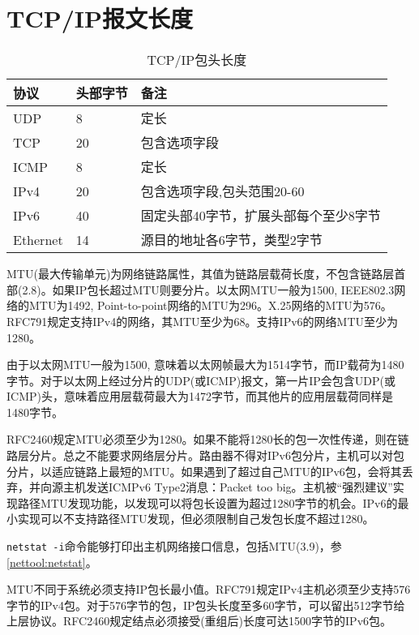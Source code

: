 
\section{TCP/IP报文长度}

\begin{table}[ht]
\begin{center}
\begin{tabular}{|l|l|l|}
\hline
协议 & 头部字节 & 备注 \\
\hline
UDP & 8 &   定长 \\
\hline
TCP & 20 & 包含选项字段 \\
\hline
ICMP & 8 & 定长 \\
\hline
IPv4 & 20 & 包含选项字段,包头范围20-60 \\
\hline
IPv6 & 40 & 固定头部40字节，扩展头部每个至少8字节 \\
\hline
Ethernet & 14 & 源目的地址各6字节，类型2字节\\
\hline
\end{tabular}
\caption{TCP/IP包头长度}
\end{center}


\end{table}

MTU(最大传输单元)为网络链路属性，其值为链路层载荷长度，不包含链路层首部(\cite{tcpipill}2.8)。如果IP包长超过MTU则要分片。以太网MTU一般为1500, IEEE802.3网络的MTU为1492, Point-to-point网络的MTU为296。X.25网络的MTU为576。RFC791规定支持IPv4的网络，其MTU至少为68。支持IPv6的网络MTU至少为1280。

由于以太网MTU一般为1500, 意味着以太网帧最大为1514字节，而IP载荷为1480字节。对于以太网上经过分片的UDP(或ICMP)报文，第一片IP会包含UDP(或ICMP)头，意味着应用层载荷最大为1472字节，而其他片的应用层载荷同样是1480字节。

RFC2460规定MTU必须至少为1280。如果不能将1280长的包一次性传递，则在链路层分片。总之不能要求网络层分片。路由器不得对IPv6包分片，主机可以对包分片，以适应链路上最短的MTU。如果遇到了超过自己MTU的IPv6包，会将其丢弃，并向源主机发送ICMPv6 Type2消息：Packet too big。主机被“强烈建议”实现路径MTU发现功能，以发现可以将包长设置为超过1280字节的机会。IPv6的最小实现可以不支持路径MTU发现，但必须限制自己发包长度不超过1280。


\verb+netstat -i+命令能够打印出主机网络接口信息，包括MTU(\cite{tcpipill}3.9)，参\ref{nettool:netstat}。

MTU不同于系统必须支持IP包长最小值。RFC791规定IPv4主机必须至少支持576字节的IPv4包。对于576字节的包，IP包头长度至多60字节，可以留出512字节给上层协议。RFC2460规定结点必须接受(重组后)长度可达1500字节的IPv6包。


